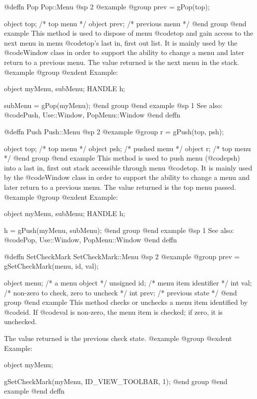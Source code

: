@deffn {Pop} Pop::Menu
@sp 2
@example
@group
prev = gPop(top);

object  top;    /*  top menu       */
object  prev;   /*  previous menu  */
@end group
@end example
This method is used to dispose of menu @code{top} and gain access to the
next menu in menu @code{top}'s last in, first out list.  It is mainly
used by the @code{Window} class in order to support the ability to
change a menu and later return to a previous menu.  The value returned
is the next menu in the stack.
@example
@group
@exdent Example:

object  myMenu, subMenu;
HANDLE  h;

subMenu = gPop(myMenu);
@end group
@end example
@sp 1
See also:  @code{Push, Use::Window, PopMenu::Window}
@end deffn






@deffn {Push} Push::Menu
@sp 2
@example
@group
r = gPush(top, psh);

object  top;    /*  top menu     */
object  psh;    /*  pushed menu  */
object  r;      /*  top menu     */
@end group
@end example
This method is used to push menu (@code{psh}) into a last in, first out
stack accessible through menu @code{top}.  It is mainly used by the
@code{Window} class in order to support the ability to change a menu and
later return to a previous menu.  The value returned is the top menu
passed.
@example
@group
@exdent Example:

object  myMenu, subMenu;
HANDLE  h;

h = gPush(myMenu, subMenu);
@end group
@end example
@sp 1
See also:  @code{Pop, Use::Window, PopMenu::Window}
@end deffn




@deffn {SetCheckMark} SetCheckMark::Menu
@sp 2
@example
@group
prev = gSetCheckMark(menu, id, val);

object    menu;   /*  a menu object        */
unsigned  id;     /*  menu item identifier  */
int       val;    /*  non-zero to check, zero to uncheck  */
int       prev;   /*  previous state       */
@end group
@end example
This method checks or unchecks a menu item identified by @code{id}.
If @code{val} is non-zero, the menu item is checked; if zero, it is
unchecked.

The value returned is the previous check state.
@example
@group
@exdent Example:

object  myMenu;

gSetCheckMark(myMenu, ID_VIEW_TOOLBAR, 1);
@end group
@end example
@end deffn








